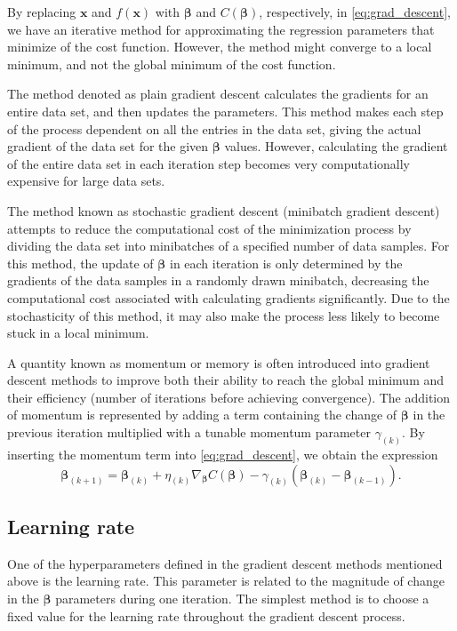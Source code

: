 \documentclass[12pt]{article}
\begin{document}
By replacing $\boldsymbol{x}$ and $f(\boldsymbol{x})$ with $\boldsymbol{\beta}$ and $C(\boldsymbol{\beta})$, respectively, in \autoref{eq:grad_descent}, we have an iterative method for approximating the regression parameters that minimize of the cost function. However, the method might converge to a local minimum, and not the global minimum of the cost function.

The method denoted as plain gradient descent calculates the gradients for an entire data set, and then updates the parameters. This method makes each step of the process dependent on all the entries in the data set, giving the actual gradient of the data set for the given $\boldsymbol{\beta}$ values. However, calculating the gradient of the entire data set in each iteration step becomes very computationally expensive for large data sets. 

The method known as stochastic gradient descent (minibatch gradient descent) attempts to reduce the computational cost of the minimization process by dividing the data set into minibatches of a specified number of data samples. For this method, the update of $\boldsymbol{\beta}$ in each iteration is only determined by the gradients of the data samples in a randomly drawn minibatch, decreasing the computational cost associated with calculating gradients significantly. Due to the stochasticity of this method, it may also make the process less likely to become stuck in a local minimum. 

A quantity known as momentum or memory is often introduced into gradient descent methods to improve both their ability to reach the global minimum and their efficiency (number of iterations before achieving convergence). The addition of momentum is represented by adding a term containing the change of $\boldsymbol{\beta}$ in the previous iteration multiplied with a tunable momentum parameter $\gamma_{(k)}$. By inserting the momentum term into \autoref{eq:grad_descent}, we obtain the expression
\begin{equation}\label{eq:grad_descent_momentum}
    \boldsymbol{\beta}_{(k+1)} = \boldsymbol{\beta}_{(k)} + \eta_{(k)} \nabla_{\boldsymbol{\beta}} C(\boldsymbol{\beta}) - \gamma_{(k)} (\boldsymbol{\beta}_{(k)} - \boldsymbol{\beta}_{(k-1)}).
\end{equation}

\subsection{Learning rate} \label{sec:learning_rate}
One of the hyperparameters defined in the gradient descent methods mentioned above is the learning rate. This parameter is related to the magnitude of change in the $\boldsymbol{\beta}$ parameters during one iteration. The simplest method is to choose a fixed value for the learning rate throughout the gradient descent process. 
\end{document}

